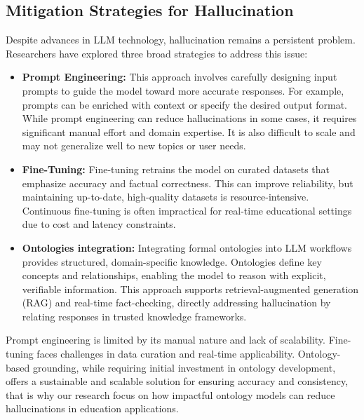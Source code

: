 \subsection{Mitigation Strategies for Hallucination}


Despite advances in LLM technology, hallucination remains a persistent problem. Researchers have explored three broad strategies to address this issue:

\begin{itemize}
    \item \textbf{Prompt Engineering:} This approach involves carefully designing input prompts to guide the model toward more accurate responses. For example, prompts can be enriched with context or specify the desired output format. While prompt engineering can reduce hallucinations in some cases, it requires significant manual effort and domain expertise. It is also difficult to scale and may not generalize well to new topics or user needs.
    \item \textbf{Fine-Tuning:} Fine-tuning retrains the model on curated datasets that emphasize accuracy and factual correctness. This can improve reliability, but maintaining up-to-date, high-quality datasets is resource-intensive. Continuous fine-tuning is often impractical for real-time educational settings due to cost and latency constraints.
    \item \textbf{Ontologies integration:} Integrating formal ontologies into LLM workflows provides structured, domain-specific knowledge. Ontologies define key concepts and relationships, enabling the model to reason with explicit, verifiable information. This approach supports retrieval-augmented generation (RAG) and real-time fact-checking, directly addressing hallucination by relating responses in trusted knowledge frameworks.
\end{itemize}


Prompt engineering is limited by its manual nature and lack of scalability. Fine-tuning faces challenges in data curation and real-time applicability. Ontology-based grounding, while requiring initial investment in ontology development, offers a sustainable and scalable solution for ensuring accuracy and consistency, that is why our research focus on how impactful ontology models can reduce hallucinations in education applications.

